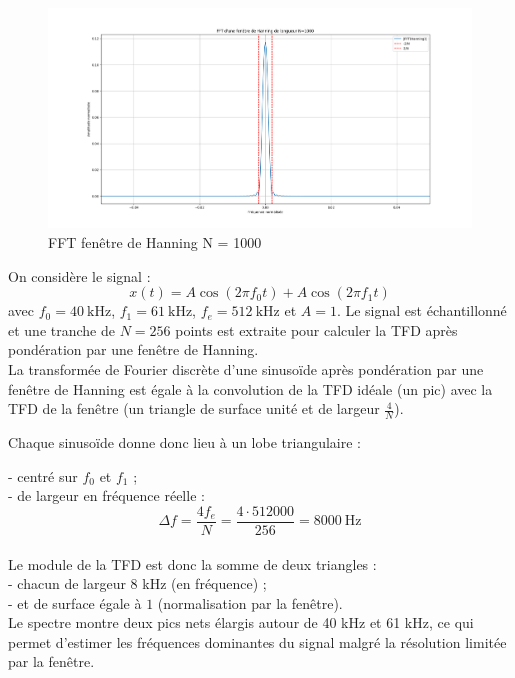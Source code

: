 \begin{figure}[h!]
    \centering
    \includegraphics[width=18cm]{screenshots/triangle_hanning_1000.png}
    \caption{FFT fenêtre de Hanning N = 1000}
\end{figure}

\newpage

On considère le signal :
\[
x(t) = A \cos(2\pi f_0 t) + A \cos(2\pi f_1 t)
\]
avec $f_0 = 40~\text{kHz}$, $f_1 = 61~\text{kHz}$, $f_e = 512~\text{kHz}$ et $A = 1$. Le signal est échantillonné et une tranche de $N = 256$ points est extraite pour calculer la TFD après pondération par une fenêtre de Hanning.\\

La transformée de Fourier discrète d’une sinusoïde après pondération par une fenêtre de Hanning est égale à la convolution de la TFD idéale (un pic) avec la TFD de la fenêtre (un triangle de surface unité et de largeur $\frac{4}{N}$).

Chaque sinusoïde donne donc lieu à un lobe triangulaire :

- centré sur $f_0$ et $f_1$ ;\\

- de largeur en fréquence réelle :
\[
\Delta f = \frac{4f_e}{N} = \frac{4 \cdot 512000}{256} = 8000~\text{Hz}
\] \\

Le module de la TFD est donc la somme de deux triangles :\\

- chacun de largeur $8$ kHz (en fréquence) ; \\

- et de surface égale à $1$ (normalisation par la fenêtre).\\

Le spectre montre deux pics nets élargis autour de 40 kHz et 61 kHz, ce qui permet d’estimer les fréquences dominantes du signal malgré la résolution limitée par la fenêtre.\\


